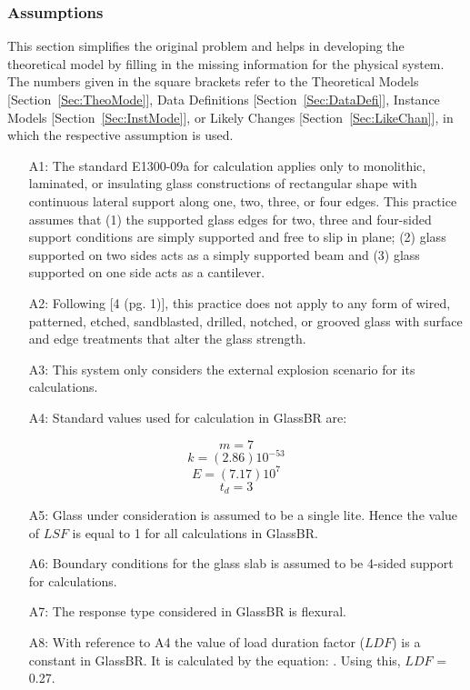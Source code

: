 \documentclass[12pt]{article}
\begin{document}
\subsubsection{Assumptions}
\label{Sec:Assu}
This section simplifies the original problem and helps in developing the theoretical model by filling in the missing information for the physical system. The numbers given in the square brackets refer to the Theoretical Models [Section~\ref{Sec:TheoMode}], Data Definitions [Section~\ref{Sec:DataDefi}], Instance Models [Section~\ref{Sec:InstMode}], or Likely Changes [Section~\ref{Sec:LikeChan}], in which the respective assumption is used.
\begin{itemize}
\item[A1:]The standard E1300-09a for calculation applies only to monolithic, laminated, or insulating glass constructions of rectangular shape with continuous lateral support along one, two, three, or four edges. This practice assumes that (1) the supported glass edges for two, three and four-sided support conditions are simply supported and free to slip in plane; (2) glass supported on two sides acts as a simply supported beam and (3) glass supported on one side acts as a cantilever.
\item[A2:]Following [4 (pg. 1)], this practice does not apply to any form of wired, patterned, etched, sandblasted, drilled, notched, or grooved glass with surface and edge treatments that alter the glass strength.
\item[A3:]This system only considers the external explosion scenario for its calculations.
\item[A4:]Standard values used for calculation in GlassBR are:
\end{itemize}
\begin{equation}
m=7
\end{equation}
\begin{equation}
k=(2.86)10^{-53}
\end{equation}
\begin{equation}
E=(7.17)10^{7}
\end{equation}
\begin{equation}
t_{d}=3
\end{equation}
\begin{itemize}
\item[A5:]Glass under consideration is assumed to be a single lite. Hence the value of $LSF$ is equal to 1 for all calculations in GlassBR.
\item[A6:]Boundary conditions for the glass slab is assumed to be 4-sided support for calculations.
\item[A7:]The response type considered in GlassBR is flexural.
\item[A8:]With reference to A4 the value of load duration factor ($LDF$) is a constant in GlassBR. It is calculated by the equation: . Using this, $LDF$ = 0.27.
\end{itemize}
\end{document}
